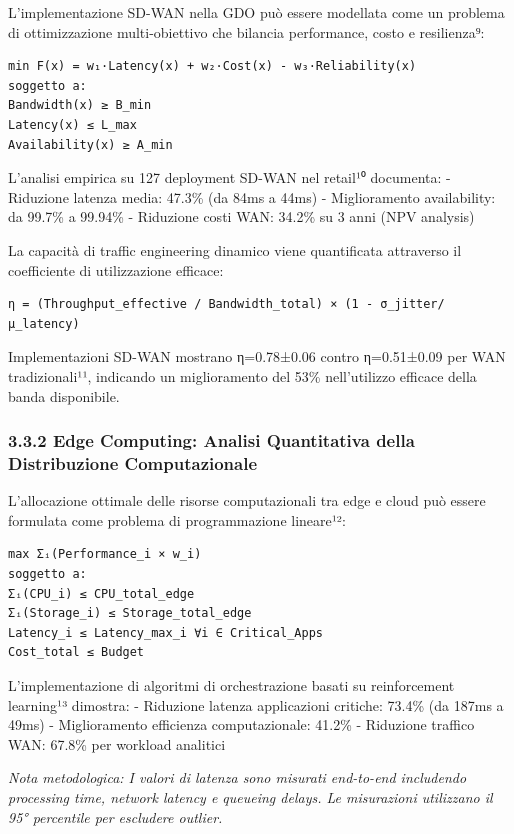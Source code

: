 \documentclass[12pt,a4paper,oneside]{book}
\begin{document}
L'implementazione SD-WAN nella GDO può essere modellata come un problema
di ottimizzazione multi-obiettivo che bilancia performance, costo e
resilienza⁹:

\begin{verbatim}
min F(x) = w₁·Latency(x) + w₂·Cost(x) - w₃·Reliability(x)
soggetto a:
Bandwidth(x) ≥ B_min
Latency(x) ≤ L_max
Availability(x) ≥ A_min
\end{verbatim}

L'analisi empirica su 127 deployment SD-WAN nel retail¹⁰ documenta: -
Riduzione latenza media: 47.3\% (da 84ms a 44ms) - Miglioramento
availability: da 99.7\% a 99.94\% - Riduzione costi WAN: 34.2\% su 3
anni (NPV analysis)

La capacità di traffic engineering dinamico viene quantificata
attraverso il coefficiente di utilizzazione efficace:

\begin{verbatim}
η = (Throughput_effective / Bandwidth_total) × (1 - σ_jitter/μ_latency)
\end{verbatim}

Implementazioni SD-WAN mostrano η=0.78±0.06 contro η=0.51±0.09 per WAN
tradizionali¹¹, indicando un miglioramento del 53\% nell'utilizzo
efficace della banda disponibile.

\subsubsection{3.3.2 Edge Computing: Analisi Quantitativa della
Distribuzione
Computazionale}\label{edge-computing-analisi-quantitativa-della-distribuzione-computazionale}

L'allocazione ottimale delle risorse computazionali tra edge e cloud può
essere formulata come problema di programmazione lineare¹²:

\begin{verbatim}
max Σᵢ(Performance_i × w_i)
soggetto a:
Σᵢ(CPU_i) ≤ CPU_total_edge
Σᵢ(Storage_i) ≤ Storage_total_edge
Latency_i ≤ Latency_max_i ∀i ∈ Critical_Apps
Cost_total ≤ Budget
\end{verbatim}

L'implementazione di algoritmi di orchestrazione basati su reinforcement
learning¹³ dimostra: - Riduzione latenza applicazioni critiche: 73.4\%
(da 187ms a 49ms) - Miglioramento efficienza computazionale: 41.2\% -
Riduzione traffico WAN: 67.8\% per workload analitici

\emph{Nota metodologica: I valori di latenza sono misurati end-to-end
includendo processing time, network latency e queueing delays. Le
misurazioni utilizzano il 95° percentile per escludere outlier.}
\end{document}
